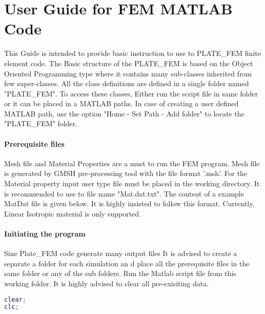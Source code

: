 \documentclass[main.tex]{subfiles}
\begin{document}
\chapter{User Guide for FEM MATLAB Code}

This Guide is intended to provide basic instruction to use to PLATE\_FEM finite element code. The Basic structure of the PLATE\_FEM is based on the Object Oriented Programming type where it contains many sub-classes inherited from few super-classes. All the class definitions are defined in a single folder named "PLATE\_FEM". To access these classes, Either run the script file in same folder or it can be placed in a MATLAB paths. In case of creating a user defined MATLAB path, use the option "Home - Set Path - Add folder" to locate the "PLATE\_FEM" folder.

\subsubsection{Prerequisite files}
Mesh file and Material Properties are a must to run the FEM program. Mesh file is generated by GMSH pre-processing tool with the file format '.msh'. For the Material property input user type file must be placed in the working directory. It is recommended to use to file name "Mat.dat.txt". The content of a example MatDat file is given below.  It is highly insisted to follow this format. Currently, Linear Isotropic material is only supported.

%

 
\subsubsection{Initiating the program}

%
Sine Plate\_FEM code generate many output files It is advised to create a separate a folder for each simulation an d place all the prerequisite  files in the same folder or any of the sub folders. Run the Matlab script file from this working folder. It is highly advised to clear all pre-exisiting data.
\begin{lstlisting}[language=matlab]
clear;
clc;
\end{lstlisting}
\end{document}
